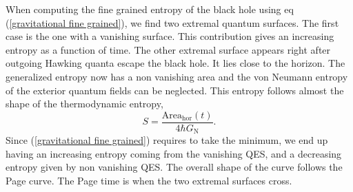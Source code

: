 When computing the fine grained entropy of the black hole using eq (\ref{gravitational fine grained}), we find two extremal quantum surfaces. The first case is the one with a vanishing surface. This contribution gives an increasing entropy as a function of time. The other extremal surface appears right after outgoing Hawking quanta escape the black hole. It lies close to the horizon. The generalized entropy now has a non vanishing area and the von Neumann entropy of the exterior quantum fields can be neglected. This entropy follows almost the shape of the thermodynamic entropy,
\begin{equation}
    S = \frac{\text{Area}_\text{hor}\left(t\right)}{4\hbar G_\text{N}}.
\end{equation}
Since (\ref{gravitational fine grained}) requires to take the minimum, we end up having an increasing entropy coming from the vanishing QES, and a decreasing entropy given by non vanishing QES. The overall shape of the curve follows the Page curve. The Page time is when the two extremal surfaces cross.

